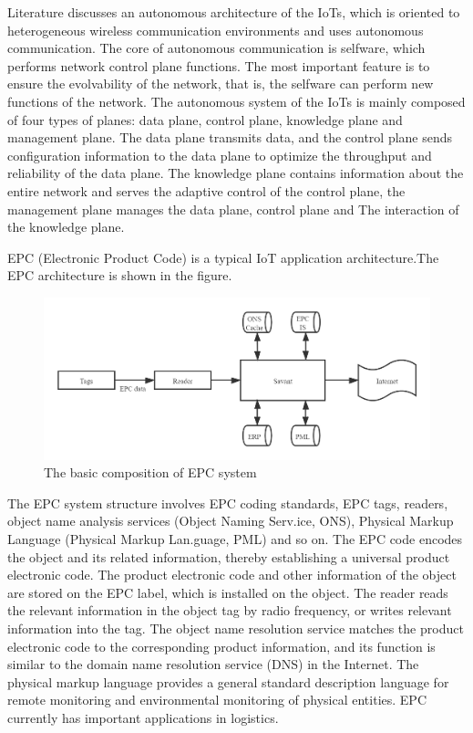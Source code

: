 \documentclass[a4paper,11pt]{article}
\begin{document}
Literature\cite{5} discusses an autonomous architecture of the IoTs, which is oriented to heterogeneous wireless communication environments and uses autonomous communication. The core of autonomous communication is selfware, which performs network control plane functions. The most important feature is to ensure the evolvability of the network, that is, the selfware can perform new functions of the network. The autonomous system of the IoTs is mainly composed of four types of planes: data plane, control plane, knowledge plane and management plane. The data plane transmits data, and the control plane sends configuration information to the data plane to optimize the throughput and reliability of the data plane. The knowledge plane contains information about the entire network and serves the adaptive control of the control plane, the management plane manages the data plane, control plane and The interaction of the knowledge plane.

EPC (Electronic Product Code) is a typical IoT application architecture.The EPC architecture is shown in the figure.
\begin{figure}[H]
\centering
\includegraphics[width=6.5in]{figures/1.png}
\caption{The basic composition of EPC system}
\end{figure}
The EPC system structure involves EPC coding standards, EPC tags, readers, object name analysis services (Object Naming Serv.ice, ONS), Physical Markup Language (Physical Markup Lan.guage, PML) and so on. The EPC code encodes the object and its related information, thereby establishing a universal product electronic code. The product electronic code and other information of the object are stored on the EPC label, which is installed on the object. The reader reads the relevant information in the object tag by radio frequency, or writes relevant information into the tag. The object name resolution service matches the product electronic code to the corresponding product information, and its function is similar to the domain name resolution service (DNS) in the Internet. The physical markup language provides a general standard description language for remote monitoring and environmental monitoring of physical entities. EPC currently has important applications in logistics.
\end{document}

